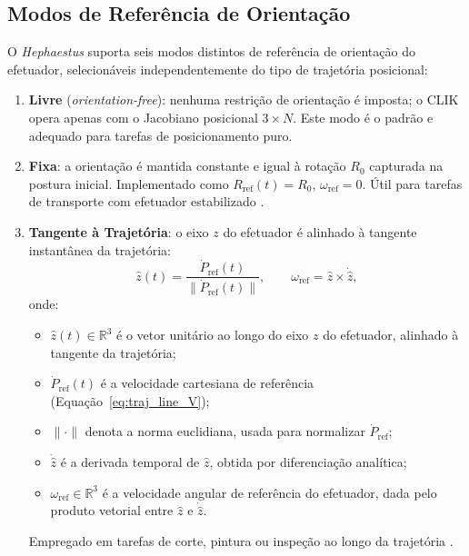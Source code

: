 \subsection{Modos de Referência de Orientação}
\label{sec:orient_modes}

O \textit{Hephaestus} suporta seis modos distintos de referência de orientação do efetuador, selecionáveis independentemente do tipo de trajetória posicional:

\begin{enumerate}
    \item \textbf{Livre} (\textit{orientation-free}): nenhuma restrição de orientação é imposta; o CLIK opera apenas com o Jacobiano posicional $3 \times N$. Este modo é o padrão e adequado para tarefas de posicionamento puro.
    
    \item \textbf{Fixa}: a orientação é mantida constante e igual à rotação $R_0$ capturada na postura inicial. Implementado como $R_{\text{ref}}(t) = R_0$, $\omega_{\text{ref}} = 0$. Útil para tarefas de transporte com efetuador estabilizado \cite{siciliano2009robotics}.
    
    \item \textbf{Tangente à Trajetória}: o eixo $z$ do efetuador é alinhado à tangente instantânea da trajetória:
    \begin{equation}
        \hat{z}(t) = \frac{\dot{P}_{\text{ref}}(t)}{\|\dot{P}_{\text{ref}}(t)\|}, \qquad
        \omega_{\text{ref}} = \hat{z} \times \dot{\hat{z}},
        \label{eq:orient_tangent}
    \end{equation}
    onde:
    \begin{itemize}
        \item $\hat{z}(t) \in \mathbb{R}^3$ é o vetor unitário ao longo do eixo $z$ do efetuador, alinhado à tangente da trajetória;
        \item $\dot{P}_{\text{ref}}(t)$ é a velocidade cartesiana de referência (Equação~\eqref{eq:traj_line_V});
        \item $\|\cdot\|$ denota a norma euclidiana, usada para normalizar $\dot{P}_{\text{ref}}$;
        \item $\dot{\hat{z}}$ é a derivada temporal de $\hat{z}$, obtida por diferenciação analítica;
        \item $\omega_{\text{ref}} \in \mathbb{R}^3$ é a velocidade angular de referência do efetuador, dada pelo produto vetorial entre $\hat{z}$ e $\dot{\hat{z}}$.
    \end{itemize} Empregado em tarefas de corte, pintura ou inspeção ao longo da trajetória \cite{siciliano2009robotics}.
    

\end{enumerate}
